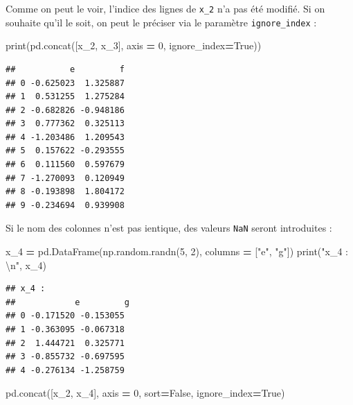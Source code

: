 \documentclass[12pt,]{book}
\newenvironment{Shaded}{\begin{snugshade}}{\end{snugshade}}
\newcommand{\DecValTok}[1]{\textcolor[rgb]{0.00,0.00,0.81}{#1}}
\newcommand{\CharTok}[1]{\textcolor[rgb]{0.31,0.60,0.02}{#1}}
\newcommand{\StringTok}[1]{\textcolor[rgb]{0.31,0.60,0.02}{#1}}
\newcommand{\VariableTok}[1]{\textcolor[rgb]{0.00,0.00,0.00}{#1}}
\newcommand{\OperatorTok}[1]{\textcolor[rgb]{0.81,0.36,0.00}{\textbf{#1}}}
\newcommand{\BuiltInTok}[1]{#1}
\newcommand{\NormalTok}[1]{#1}
\numberwithin{equation}{section}
\numberwithin{countremarque}{section}
\begin{document}
Comme on peut le voir, l'indice des lignes de \texttt{x\_2} n'a pas été
modifié. Si on souhaite qu'il le soit, on peut le préciser via le
paramètre \texttt{ignore\_index} :

\begin{Shaded}
\begin{Highlighting}[]
\BuiltInTok{print}\NormalTok{(pd.concat([x_2, x_3], axis }\OperatorTok{=} \DecValTok{0}\NormalTok{, ignore_index}\OperatorTok{=}\VariableTok{True}\NormalTok{))}
\end{Highlighting}
\end{Shaded}

\begin{lstlisting}
##           e         f
## 0 -0.625023  1.325887
## 1  0.531255  1.275284
## 2 -0.682826 -0.948186
## 3  0.777362  0.325113
## 4 -1.203486  1.209543
## 5  0.157622 -0.293555
## 6  0.111560  0.597679
## 7 -1.270093  0.120949
## 8 -0.193898  1.804172
## 9 -0.234694  0.939908
\end{lstlisting}

Si le nom des colonnes n'est pas ientique, des valeurs \texttt{NaN}
seront introduites :

\begin{Shaded}
\begin{Highlighting}[]
\NormalTok{x_4 }\OperatorTok{=}\NormalTok{ pd.DataFrame(np.random.randn(}\DecValTok{5}\NormalTok{, }\DecValTok{2}\NormalTok{),}
\NormalTok{                   columns }\OperatorTok{=}\NormalTok{ [}\StringTok{"e"}\NormalTok{, }\StringTok{"g"}\NormalTok{])}
\BuiltInTok{print}\NormalTok{(}\StringTok{"x_4 : }\CharTok{\textbackslash{}n}\StringTok{"}\NormalTok{, x_4)}
\end{Highlighting}
\end{Shaded}

\begin{lstlisting}
## x_4 : 
##            e         g
## 0 -0.171520 -0.153055
## 1 -0.363095 -0.067318
## 2  1.444721  0.325771
## 3 -0.855732 -0.697595
## 4 -0.276134 -1.258759
\end{lstlisting}

\begin{Shaded}
\begin{Highlighting}[]
\NormalTok{pd.concat([x_2, x_4], axis }\OperatorTok{=} \DecValTok{0}\NormalTok{, sort}\OperatorTok{=}\VariableTok{False}\NormalTok{, ignore_index}\OperatorTok{=}\VariableTok{True}\NormalTok{)}
\end{Highlighting}
\end{Shaded}
\end{document}
